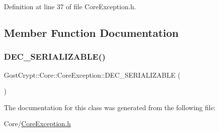 Definition at line 37 of file Core\+Exception.\+h.



\subsection{Member Function Documentation}
\mbox{\label{class_gost_crypt_1_1_core_1_1_core_exception_ae03bef21e61c2c09c24a6d75c2b861d0}} 
\subsubsection{\texorpdfstring{D\+E\+C\+\_\+\+S\+E\+R\+I\+A\+L\+I\+Z\+A\+B\+L\+E()}{DEC\_SERIALIZABLE()}}
{\footnotesize\ttfamily Gost\+Crypt\+::\+Core\+::\+Core\+Exception\+::\+D\+E\+C\+\_\+\+S\+E\+R\+I\+A\+L\+I\+Z\+A\+B\+LE (\begin{DoxyParamCaption}\item[{\hyperlink{class_gost_crypt_1_1_core_1_1_core_exception}{Core\+Exception}}]{ }\end{DoxyParamCaption})}



The documentation for this class was generated from the following file\+:\begin{DoxyCompactItemize}
\item 
Core/\hyperlink{_core_exception_8h}{Core\+Exception.\+h}\end{DoxyCompactItemize}
